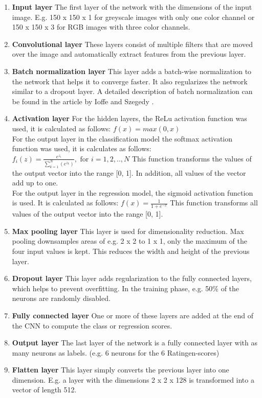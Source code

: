 \documentclass[12pt]{article}
\begin{document}
\begin{enumerate}[label=(\alph*)]
\item \textbf{Input layer} The first layer of the network with the dimensions of the input image. E.g.  150 x 150 x 1 for greyscale images with only one color channel or 150 x 150 x 3 for RGB images with three color channels.
\item \textbf{Convolutional layer} These layers consist of multiple filters that are moved over the image and automatically extract features from the previous layer.
\item \textbf{Batch normalization layer} This layer adds a batch-wise normalization to the network that helps it to converge faster. It also regularizes the network similar to a dropout layer. A detailed description of batch normalization can be found in the article by Ioffe and Szegedy \cite{ioffe_2015}.
\item \textbf{Activation layer} For the hidden layers, the ReLu activation function was used, it is calculated as follows: $f(x) = max(0, x)$ \cite{relu}\\ For the output layer in the classification model the softmax activation function was used, it is calculates as follows: $f_i(z) = \frac{e^{z_i}}{\sum^{N}_{k=1} (e^{z_k})}, \text{	    for    } i = 1, 2, .., N$ \cite{softmax} This function transforms the values of the output vector into the range [0, 1]. In addition, all values of the vector add up to one. \\ For the output layer in the regression model, the sigmoid activation function is used. It is calculated as follows: $f(x) = \frac{1}{1 + e^{-x}}$ \cite{sigmoid} This function transforms all values of the output vector into the range [0, 1].
\item \textbf{Max pooling layer} This layer is used for dimensionality reduction. Max pooling downsamples areas of e.g. 2 x 2 to 1 x 1, only the maximum of the four input values is kept. This reduces the width and height of the previous layer.
\item \textbf{Dropout layer} This layer adds regularization to the fully connected layers, which helps to prevent overfitting. In the training phase, e.g. 50\% of the neurons are randomly disabled.
\item \textbf{Fully connected layer} One or more of these layers are added at the end of the CNN to compute the class or regression scores.
\item \textbf{Output layer} The last layer of the network is a fully connected layer with as many neurons as labels. (e.g. 6 neurons for the 6 Ratingen-scores)
\item \textbf{Flatten layer} This layer simply converts the previous layer into one dimension. E.g. a layer with the dimensions 2 x 2 x 128 is transformed into a vector of length 512.
\end{enumerate}
\end{document}
